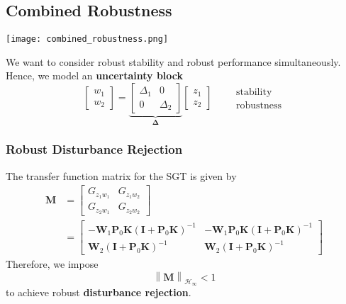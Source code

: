 \subsection{Combined Robustness}
\begin{center}
    \texttt{[image: combined\_robustness.png]}
\end{center}
We want to consider robust stability and robust performance simultaneously. Hence, we model an \textbf{uncertainty block}
\begin{equation*}
    \begin{bmatrix}
        w_1 \\
        w_2
    \end{bmatrix}
    =\underbrace{\begin{bmatrix}
            \Delta_1 & 0        \\
            0        & \Delta_2
        \end{bmatrix}}_{\boldsymbol{\Delta}}
    \begin{bmatrix}z_1 \\
        z_2
    \end{bmatrix}\qquad
    \begin{matrix}
        \mathrm{stability} \\
        \mathrm{robustness}
    \end{matrix}
\end{equation*}

\subsubsection{Robust Disturbance Rejection}

The transfer function matrix for the SGT is given by
\begin{align*}
    \mathbf{M} & =
    \begin{bmatrix}
        G_{{z_{1}w_{1}}} & G_{{z_{1}w_{2}}} \\
        G_{{z_{2}w_{1}}} & G_{{z_{2}w_{2}}}
    \end{bmatrix}                                                                                                                                                                                                                  \\
               & =\begin{bmatrix}
                      -\mathbf{W}_1\mathbf{P}_0\mathbf{K}{(\mathbf{I}+\mathbf{P}_0\mathbf{K})}^{-1} & -\mathbf{W}_1 \mathbf{P}_0\mathbf{K}{(\mathbf{I}+\mathbf{P}_0\mathbf{K})}^{-1} \\
                      \mathbf{W}_2{(\mathbf{I}+\mathbf{P}_0\mathbf{K})}^{-1}                        & \mathbf{W}_2{(\mathbf{I}+\mathbf{P}_0\mathbf{K})}^{-1}
                  \end{bmatrix}
\end{align*}
Therefore, we impose
\begin{equation*}
    \left\|\mathbf{M}\right\|_{\mathcal{H}_\infty}<1
\end{equation*}
to achieve robust \textbf{disturbance rejection}.


